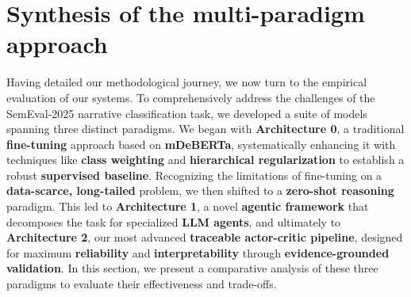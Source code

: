 \section{Synthesis of the multi-paradigm approach}
Having detailed our methodological journey, we now turn to the empirical evaluation of our systems. To comprehensively address the challenges of the SemEval-2025 narrative classification task, we developed a suite of models spanning three distinct paradigms. We began with \textbf{Architecture 0}, a traditional \textbf{fine-tuning} approach based on \textbf{mDeBERTa}, systematically enhancing it with techniques like \textbf{class weighting} and \textbf{hierarchical regularization} to establish a robust \textbf{supervised baseline}. Recognizing the limitations of fine-tuning on a \textbf{data-scarce, long-tailed} problem, we then shifted to a \textbf{zero-shot reasoning} paradigm. This led to \textbf{Architecture 1}, a novel \textbf{agentic framework} that decomposes the task for specialized \textbf{LLM agents}, and ultimately to \textbf{Architecture 2}, our most advanced \textbf{traceable actor-critic pipeline}, designed for maximum \textbf{reliability} and \textbf{interpretability} through \textbf{evidence-grounded validation}. In this section, we present a comparative analysis of these three paradigms to evaluate their effectiveness and trade-offs.